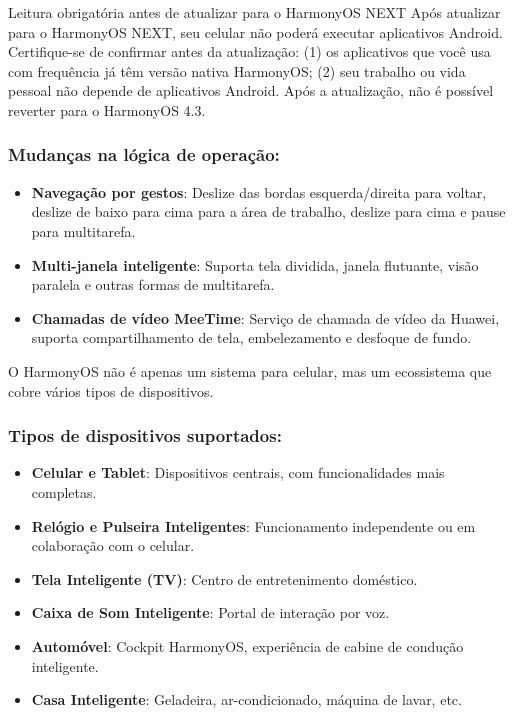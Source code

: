 \begin{tcbwarn}{Leitura obrigatória antes de atualizar para o HarmonyOS NEXT}
Após atualizar para o HarmonyOS NEXT, seu celular não poderá executar aplicativos Android. Certifique-se de confirmar antes da atualização: (1) os aplicativos que você usa com frequência já têm versão nativa HarmonyOS; (2) seu trabalho ou vida pessoal não depende de aplicativos Android. Após a atualização, não é possível reverter para o HarmonyOS 4.3.

\end{tcbwarn}

\subsubsection*{Mudanças na lógica de operação:}

\begin{itemize}
  \item \textbf{Navegação por gestos}: Deslize das bordas esquerda/direita para voltar, deslize de baixo para cima para a área de trabalho, deslize para cima e pause para multitarefa.
  \item \textbf{Multi-janela inteligente}: Suporta tela dividida, janela flutuante, visão paralela e outras formas de multitarefa.
  \item \textbf{Chamadas de vídeo MeeTime}: Serviço de chamada de vídeo da Huawei, suporta compartilhamento de tela, embelezamento e desfoque de fundo.
\end{itemize}


O HarmonyOS não é apenas um sistema para celular, mas um ecossistema que cobre vários tipos de dispositivos.

\subsubsection*{Tipos de dispositivos suportados:}

\begin{itemize}
  \item \textbf{Celular e Tablet}: Dispositivos centrais, com funcionalidades mais completas.
  \item \textbf{Relógio e Pulseira Inteligentes}: Funcionamento independente ou em colaboração com o celular.
  \item \textbf{Tela Inteligente (TV)}: Centro de entretenimento doméstico.
  \item \textbf{Caixa de Som Inteligente}: Portal de interação por voz.
  \item \textbf{Automóvel}: Cockpit HarmonyOS, experiência de cabine de condução inteligente.
  \item \textbf{Casa Inteligente}: Geladeira, ar-condicionado, máquina de lavar, etc.
\end{itemize}

